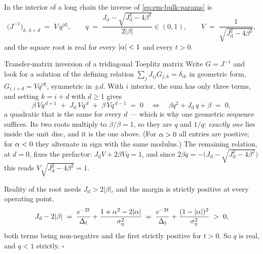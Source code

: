 \begin{proposition}
\label{prop:em-bulk}
In the interior of a long chain the inverse of \eqref{eq:em-bulk-params} is
\begin{equation}
  \big(J^{-1}\big)_{k,\,k+d} \;=\; V\,q^{|d|},
  \qquad
  q \;=\; \frac{J_{\mathrm{d}} - \sqrt{J_{\mathrm{d}}^2 - 4\beta^2}}{2|\beta|} \in (0,1),
  \qquad
  V \;=\; \frac{1}{\sqrt{J_{\mathrm{d}}^2 - 4\beta^2}},
  \label{eq:em-bulk-cov}
\end{equation}
and the square root is real for every $|\alpha| < 1$ and every $t > 0$.
\end{proposition}

\begin{toolbox}{Transfer-matrix inversion of a tridiagonal Toeplitz matrix}
Write $G = J^{-1}$ and look for a solution of the defining relation
$\sum_j J_{ij}G_{j,k} = \delta_{ik}$ in geometric form,
$G_{i,i+d} = V q^{|d|}$, symmetric in $\pm d$. With $i$ interior, the sum has
only three terms, and setting $k = i+d$ with $d \geq 1$ gives
\begin{equation*}
  \beta\, V q^{\,d+1} \;+\; J_{\mathrm{d}}\, V q^{\,d} \;+\; \beta\, V q^{\,d-1} \;=\; 0
  \quad\Longleftrightarrow\quad
  \beta q^2 + J_{\mathrm{d}}\, q + \beta \;=\; 0 ,
\end{equation*}
a quadratic that is the same for every $d$ --- which is why one geometric
sequence suffices. Its two roots multiply to $\beta/\beta = 1$, so they are
$q$ and $1/q$: \emph{exactly one} lies inside the unit disc, and it is the one
above. (For $\alpha > 0$ all entries are positive; for $\alpha < 0$ they alternate
in sign with the same modulus.) The remaining relation, at $d = 0$, fixes the
prefactor: $J_{\mathrm{d}} V + 2\beta V q = 1$, and since
$2\beta q = -\big(J_{\mathrm{d}} - \sqrt{J_{\mathrm{d}}^2 - 4\beta^2}\big)$ this
reads $V\sqrt{J_{\mathrm{d}}^2 - 4\beta^2} = 1$.

Reality of the root needs $J_{\mathrm{d}} > 2|\beta|$, and the margin is
strictly positive at every operating point,
\begin{equation*}
  J_{\mathrm{d}} - 2|\beta|
  \;=\; \frac{e^{-2t}}{\Delta_t} + \frac{1 + \alpha^2 - 2|\alpha|}{\sigma_\eta^2}
  \;=\; \frac{e^{-2t}}{\Delta_t} + \frac{(1 - |\alpha|)^2}{\sigma_\eta^2}
  \;>\; 0 ,
\end{equation*}
both terms being non-negative and the first strictly positive for $t > 0$. So
$q$ is real, and $q < 1$ strictly. \hfill$\square$
\end{toolbox}

